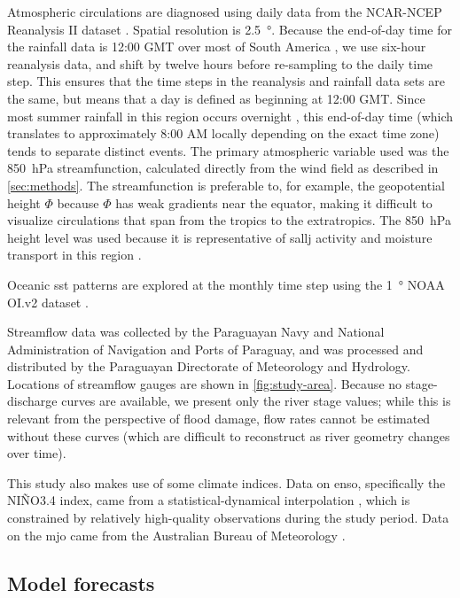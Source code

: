 \documentclass[twocol]{ametsoc}
\begin{document}
Atmospheric circulations are diagnosed using daily data from the NCAR-NCEP Reanalysis II dataset \citep{Kanamitsu2002}.
Spatial resolution is \SI{2.5}{\degree}.
Because the end-of-day time for the rainfall data is 12:00 GMT over most of South America \citep{Xie2010}, we use six-hour reanalysis data, and shift by twelve hours before re-sampling to the daily time step.
This ensures that the time steps in the reanalysis and rainfall data sets are the same, but means that a day is defined as beginning at 12:00 GMT.
Since most summer rainfall in this region occurs overnight \citep{Salio2007,Vera2006}, this end-of-day time (which translates to approximately 8:00 AM locally depending on the exact time zone) tends to separate distinct events.
The primary atmospheric variable  used was the \SI{850}{\hecto\pascal} streamfunction, calculated directly from the wind field as described in \cref{sec:methods}.
The streamfunction is preferable to, for example, the geopotential height $\Phi$ because $\Phi$ has weak gradients near the equator, making it difficult to visualize circulations that span from the tropics to the extratropics.
The \SI{850}{\hecto\pascal} height level was used because it is representative of \gls{sallj} activity and moisture transport in this region \citep{Marengo2004,Salio2007}.

Oceanic \gls{sst} patterns are explored at the monthly time step using the \SI{1}{\degree} NOAA OI.v2 dataset \citep{Reynolds2002}.

Streamflow data was collected by the Paraguayan Navy and National Administration of Navigation and Ports of Paraguay, and was processed and distributed by the Paraguayan Directorate of Meteorology and Hydrology.
Locations of streamflow gauges are shown in \cref{fig:study-area}.
Because no stage-discharge curves are available, we present only the river stage values; while this is relevant from the perspective of flood damage, flow rates cannot be estimated without these curves (which are difficult to reconstruct as river geometry changes over time).

This study also makes use of some climate indices.
Data on \gls{enso}, specifically the NI\~NO3.4 index, came from a statistical-dynamical interpolation \citep{Kaplan1998}, which is constrained by relatively high-quality observations during the study period.
Data on the \gls{mjo}   came from the Australian Bureau of Meteorology \citep{Wheeler2004}.

\subsection{Model forecasts}
\end{document}
